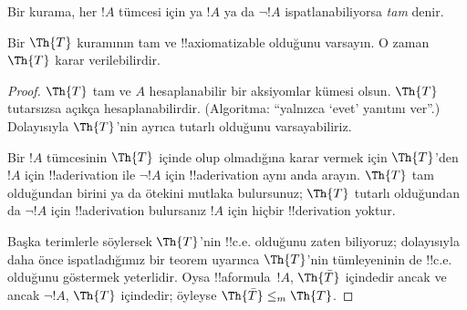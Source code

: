 \documentclass[../../../include/open-logic-section]{subfiles}
\begin{document}


Bir kurama, her $!A$ tümcesi için ya $!A$ ya da $\lnot !A$
ispatlanabiliyorsa {\em tam} denir.

\begin{lem}
Bir $\Th{T}$ kuramının tam ve !!{axiomatizable} olduğunu varsayın. O zaman
$\Th{T}$ karar verilebilirdir.
\end{lem}

\begin{proof}
$\Th{T}$ tam ve $A$ hesaplanabilir bir aksiyomlar kümesi olsun. $\Th{T}$
tutarsızsa açıkça hesaplanabilirdir. (Algoritma: “yalnızca ‘evet’ yanıtını
ver”.)
Dolayısıyla $\Th{T}$'nin ayrıca tutarlı olduğunu varsayabiliriz.

Bir $!A$ tümcesinin $\Th{T}$ içinde olup olmadığına karar vermek için
$\Th{T}$'den $!A$ için !!a{derivation} ile $\lnot !A$ için
!!a{derivation} aynı anda arayın. $\Th{T}$ tam olduğundan birini ya da
ötekini mutlaka bulursunuz; $\Th{T}$ tutarlı olduğundan da $\lnot !A$ için
!!a{derivation} bulursanız $!A$ için hiçbir !!{derivation} yoktur.

Başka terimlerle söylersek $\Th{T}$'nin !!{c.e.} olduğunu zaten biliyoruz;
dolayısıyla daha önce ispatladığımız bir teorem uyarınca
$\Th{T}$'nin tümleyeninin de !!{c.e.} olduğunu göstermek yeterlidir. Oysa
!!a{formula}~$!A$, $\Th{\bar T}$ içindedir ancak ve ancak $\lnot !A$,
$\Th{T}$ içindedir; öyleyse
$\Th{\bar T} \leq_m \Th{T}$.
\end{proof}
\end{document}
